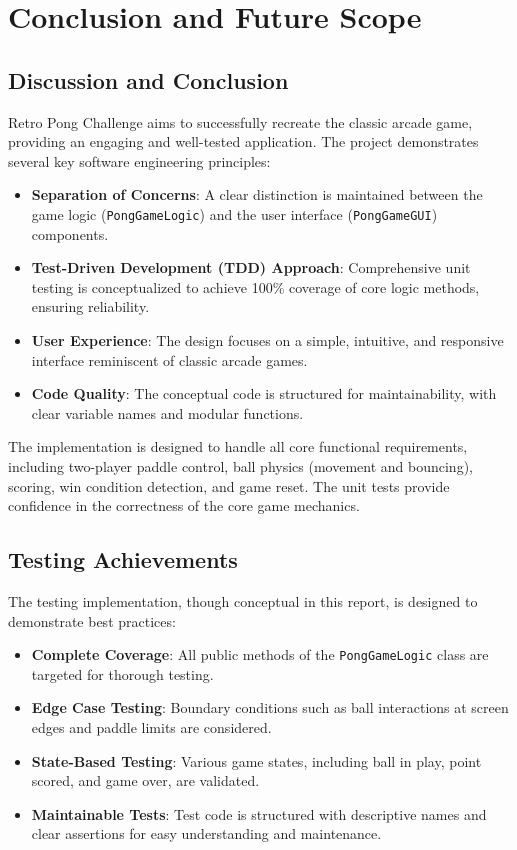 \documentclass[12pt,a4paper]{article}
\begin{document}
\section{Conclusion and Future Scope}
\subsection{Discussion and Conclusion}
Retro Pong Challenge aims to successfully recreate the classic arcade game, providing an engaging and well-tested application. The project demonstrates several key software engineering principles:
\begin{itemize}
    \item \textbf{Separation of Concerns}: A clear distinction is maintained between the game logic (\texttt{PongGameLogic}) and the user interface (\texttt{PongGameGUI}) components.
    \item \textbf{Test-Driven Development (TDD) Approach}: Comprehensive unit testing is conceptualized to achieve 100\% coverage of core logic methods, ensuring reliability.
    \item \textbf{User Experience}: The design focuses on a simple, intuitive, and responsive interface reminiscent of classic arcade games.
    \item \textbf{Code Quality}: The conceptual code is structured for maintainability, with clear variable names and modular functions.
\end{itemize}
The implementation is designed to handle all core functional requirements, including two-player paddle control, ball physics (movement and bouncing), scoring, win condition detection, and game reset. The unit tests provide confidence in the correctness of the core game mechanics.

\subsection{Testing Achievements}
The testing implementation, though conceptual in this report, is designed to demonstrate best practices:
\begin{itemize}
    \item \textbf{Complete Coverage}: All public methods of the \texttt{PongGameLogic} class are targeted for thorough testing.
    \item \textbf{Edge Case Testing}: Boundary conditions such as ball interactions at screen edges and paddle limits are considered.
    \item \textbf{State-Based Testing}: Various game states, including ball in play, point scored, and game over, are validated.
    \item \textbf{Maintainable Tests}: Test code is structured with descriptive names and clear assertions for easy understanding and maintenance.
\end{itemize}
\end{document}
